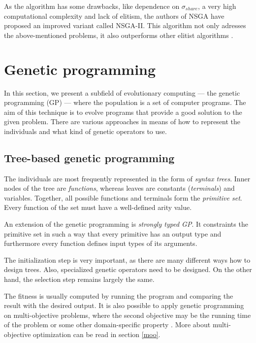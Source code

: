 \label{nsgaii}
As the algorithm has some drawbacks, like dependence on $\sigma_{share}$,
a very high computational complexity and lack of elitism, the authors of
NSGA have proposed an improved variant called NSGA-II. This algorithm not only
adresses the above-mentioned problems, it also outperforms other elitist
algorithms \citep{Deb:2002:FEM:2221359.2221582}.


\section{Genetic programming}
In this section, we present a subfield of evolutionary computing --- 
the genetic programming (GP) --- where the population is a set of computer 
programs. The aim of this technique is to evolve programs that provide 
a good solution to the given problem. There are various approaches in means 
of how to represent the individuals and what kind of genetic operators to 
use.

\subsection{Tree-based genetic programming} \label{gp:treebased}
The individuals are most frequently represented in the form of 
\emph{syntax trees}. Inner nodes of the tree are \emph{functions}, whereas 
leaves  are constants (\emph{terminals}) and variables. Together, all possible
functions and terminals form the \emph{primitive set}. Every function of the
set must have a well-defined arity value.

An extension of the genetic programming is \emph{strongly typed GP}. It
constraints the primitive set in such a way that every primitive has an output
type and furthermore every function defines input types of its arguments.

The initialization step is very important, as
there are many different ways how to design trees. Also, specialized genetic
operators need to be designed. On the other hand, the selection step remains
largely the same. \cite{Poli:2008:FGG:1796422}
 
The fitness is usually computed by running the program and comparing the result 
with the desired output. It is also possible to apply genetic programming on
multi-objective problems, where the second objective may be the running time
of the problem or some other domain-specific property
\citep{Poli:2008:FGG:1796422}. More about multi-objective optimization can be
read in section \ref{moo}.

